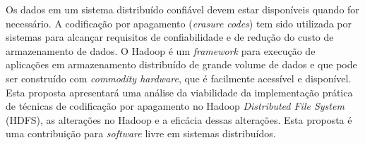   Os dados em um sistema distribuído confiável devem estar disponíveis
  quando for necessário. A codificação por apagamento (\emph{erasure
    codes}) tem sido utilizada por sistemas para alcançar requisitos
  de confiabilidade e de redução do custo de armazenamento de dados. O
  Hadoop é um \emph{framework} para execução de aplicações em
  armazenamento distribuído de grande volume de dados e que pode ser
  construído com \emph{commodity hardware}, que é facilmente acessível
  e disponível. Esta proposta apresentará uma análise da viabilidade
  da implementação prática de técnicas de codificação por apagamento
  no Hadoop \emph{Distributed File System} (HDFS), as alterações no
  Hadoop e a eficácia dessas alterações. Esta proposta é uma
  contribuição para \emph{software} livre em sistemas distribuídos.

